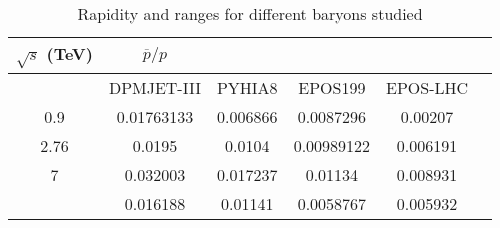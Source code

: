 


%

\begin{table*}[!htb]
{
\begin{center}
\caption{Rapidity and {\ppt} ranges for different baryons studied}
\begin{tabular}{|c||c|c|c|c|c|}
\hline\hline
   $\sqrt{s}$ (TeV)&  $\overline{p}/p$ &  &  &\\
\hline\hline
 & DPMJET-III & PYHIA8  &  EPOS199 & EPOS-LHC  \\
\hline
       0.9&0.01763133&	0.006866&	0.0087296&	0.00207\\ 
\hline
    2.76 & 0.0195& 0.0104&	0.00989122&	0.006191  \\
\hline
     7 &0.032003&	0.017237&	0.01134&	0.008931 \\
 \hline
      & 0.016188	&0.01141&	0.0058767&	0.005932\\

    
\hline
\end{tabular}
\label{tab1}
\end{center}}
\end{table*}

%
